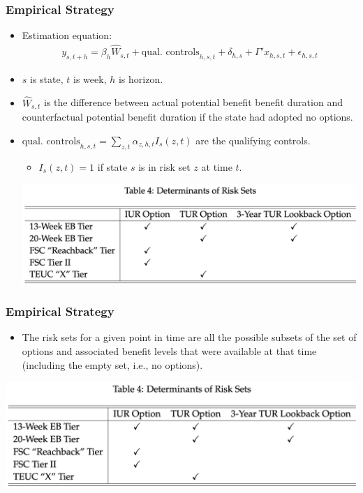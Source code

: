 \documentclass[english,xcolor=svgnames]{beamer}
\begin{document}
\begin{frame}
	\frametitle[alignment=center]{Empirical Strategy}
	\begin{itemize}
		\item Estimation equation:
		\begin{align*}
			y_{s,t+h} = \beta_h \widehat{W}_{s,t} + \text{qual. controls}_{h,s,t} + \delta_{h,s} + \Gamma'x_{h,s,t} + \epsilon_{h,s,t}
		\end{align*}
		\item $s$ is state, $t$ is week, $h$ is horizon.
		\item $\widehat{W}_{s,t}$ is the difference between actual potential benefit benefit duration and counterfactual potential benefit duration if the state had adopted no options.\\
		\item $\text{qual. controls}_{h,s,t} = \sum_{z,t}\alpha_{z,h,t}I_s(z,t)$ are the qualifying controls.
		\begin{itemize}
			\item $I_s(z,t)=1$ if state $s$ is in risk set $z$ at time $t$.
		\end{itemize}
		\includegraphics[scale=0.3]{figures/AMNSTAB4.png}
	\end{itemize}
\end{frame}

\begin{frame}
	\frametitle[alignment=center]{Empirical Strategy}
	\begin{itemize}
		\item The risk sets for a given point in time are all the possible subsets
		of the set of options and associated benefit levels that were available at that time (including the	empty set, i.e., no options). 
	\end{itemize}
	\includegraphics[scale=0.3]{figures/AMNSTAB4.png}
\end{frame}
\end{document}
